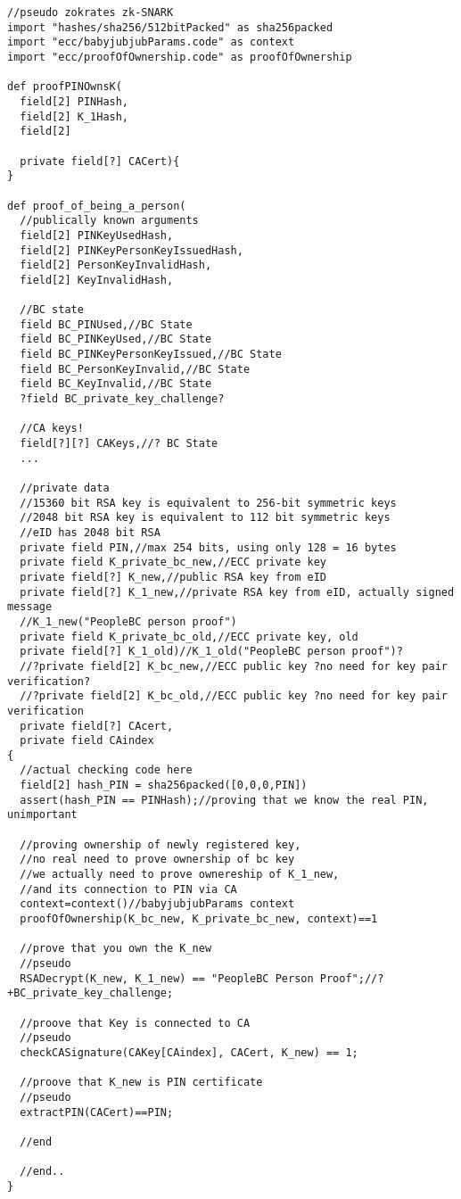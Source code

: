 \documentclass{article}
\begin{document}
\begin{lstlisting}
//pseudo zokrates zk-SNARK
import "hashes/sha256/512bitPacked" as sha256packed
import "ecc/babyjubjubParams.code" as context
import "ecc/proofOfOwnership.code" as proofOfOwnership

def proofPINOwnsK(
  field[2] PINHash,
  field[2] K_1Hash,
  field[2]

  private field[?] CACert){
}

def proof_of_being_a_person(
  //publically known arguments
  field[2] PINKeyUsedHash,
  field[2] PINKeyPersonKeyIssuedHash,
  field[2] PersonKeyInvalidHash,
  field[2] KeyInvalidHash,

  //BC state
  field BC_PINUsed,//BC State
  field BC_PINKeyUsed,//BC State
  field BC_PINKeyPersonKeyIssued,//BC State
  field BC_PersonKeyInvalid,//BC State
  field BC_KeyInvalid,//BC State
  ?field BC_private_key_challenge?

  //CA keys!
  field[?][?] CAKeys,//? BC State
  ...

  //private data
  //15360 bit RSA key is equivalent to 256-bit symmetric keys
  //2048 bit RSA key is equivalent to 112 bit symmetric keys
  //eID has 2048 bit RSA
  private field PIN,//max 254 bits, using only 128 = 16 bytes
  private field K_private_bc_new,//ECC private key
  private field[?] K_new,//public RSA key from eID
  private field[?] K_1_new,//private RSA key from eID, actually signed message
  //K_1_new("PeopleBC person proof")
  private field K_private_bc_old,//ECC private key, old
  private field[?] K_1_old)//K_1_old("PeopleBC person proof")?
  //?private field[2] K_bc_new,//ECC public key ?no need for key pair verification?
  //?private field[2] K_bc_old,//ECC public key ?no need for key pair verification
  private field[?] CAcert,
  private field CAindex
{
  //actual checking code here
  field[2] hash_PIN = sha256packed([0,0,0,PIN])
  assert(hash_PIN == PINHash);//proving that we know the real PIN, unimportant

  //proving ownership of newly registered key,
  //no real need to prove ownership of bc key
  //we actually need to prove ownereship of K_1_new,
  //and its connection to PIN via CA
  context=context()//babyjubjubParams context
  proofOfOwnership(K_bc_new, K_private_bc_new, context)==1

  //prove that you own the K_new
  //pseudo
  RSADecrypt(K_new, K_1_new) == "PeopleBC Person Proof";//?+BC_private_key_challenge;

  //proove that Key is connected to CA
  //pseudo
  checkCASignature(CAKey[CAindex], CACert, K_new) == 1;

  //proove that K_new is PIN certificate
  //pseudo
  extractPIN(CACert)==PIN;

  //end

  //end..
}
\end{lstlisting}
\newpage
\end{document}
